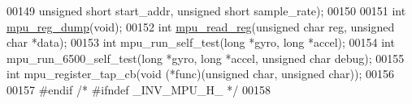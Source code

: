 \begin{DoxyCode}
00149     \textcolor{keywordtype}{unsigned} \textcolor{keywordtype}{short} start\_addr, \textcolor{keywordtype}{unsigned} \textcolor{keywordtype}{short} sample\_rate);
00150 
00151 \textcolor{keywordtype}{int} \hyperlink{group___d_r_i_v_e_r_s_ga0e1201ecfd8453f1d89e4299528baaf6}{mpu\_reg\_dump}(\textcolor{keywordtype}{void});
00152 \textcolor{keywordtype}{int} \hyperlink{group___d_r_i_v_e_r_s_ga5c35a3363337014e11769a0ea7c0dfa9}{mpu\_read\_reg}(\textcolor{keywordtype}{unsigned} \textcolor{keywordtype}{char} reg, \textcolor{keywordtype}{unsigned} \textcolor{keywordtype}{char} *data);
00153 \textcolor{keywordtype}{int} mpu\_run\_self\_test(\textcolor{keywordtype}{long} *gyro, \textcolor{keywordtype}{long} *accel);
00154 \textcolor{keywordtype}{int} mpu\_run\_6500\_self\_test(\textcolor{keywordtype}{long} *gyro, \textcolor{keywordtype}{long} *accel, \textcolor{keywordtype}{unsigned} \textcolor{keywordtype}{char} debug);
00155 \textcolor{keywordtype}{int} mpu\_register\_tap\_cb(\textcolor{keywordtype}{void} (*func)(\textcolor{keywordtype}{unsigned} \textcolor{keywordtype}{char}, \textcolor{keywordtype}{unsigned} \textcolor{keywordtype}{char}));
00156 
00157 \textcolor{preprocessor}{#endif  }\textcolor{comment}{/* #ifndef \_INV\_MPU\_H\_ */}\textcolor{preprocessor}{}
00158 
\end{DoxyCode}
